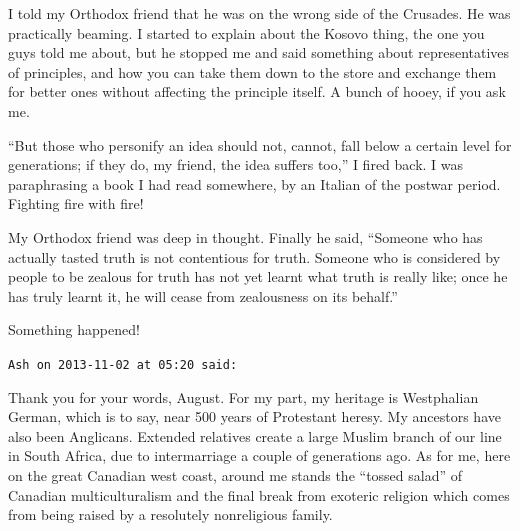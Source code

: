 \begin{footnotesize}
\begin{sffamily}
I told my Orthodox friend that he was on the wrong side of the Crusades. He was practically beaming. I started to explain about the Kosovo thing, the one you guys told me about, but he stopped me and said something about representatives of principles, and how you can take them down to the store and exchange them for better ones without affecting the principle itself. A bunch of hooey, if you ask me.

``But those who personify an idea should not, cannot, fall below a certain level for generations; if they do, my friend, the idea suffers too,'' I fired back. I was paraphrasing a book I had read somewhere, by an Italian of the postwar period. Fighting fire with fire!

My Orthodox friend was deep in thought. Finally he said, ``Someone who has actually tasted truth is not contentious for truth. Someone who is considered by people to be zealous for truth has not yet learnt what truth is really like; once he has truly learnt it, he will cease from zealousness on its behalf.''

Something happened!

\hfill

\texttt{Ash on 2013-11-02 at 05:20 said:}

Thank you for your words, August. For my part, my heritage is Westphalian German, which is to say, near 500 years of Protestant heresy. My ancestors have also been Anglicans. Extended relatives create a large Muslim branch of our line in South Africa, due to intermarriage a couple of generations ago. As for me, here on the great Canadian west coast, around me stands the ``tossed salad'' of Canadian multiculturalism and the final break from exoteric religion which comes from being raised by a resolutely nonreligious family.


\end{sffamily}
\end{footnotesize}
